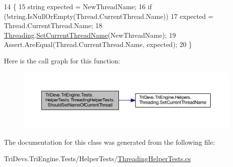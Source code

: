 \begin{DoxyCode}
14         \{
15             \textcolor{keywordtype}{string} expected = NewThreadName;
16             \textcolor{keywordflow}{if} (!\textcolor{keywordtype}{string}.IsNullOrEmpty(Thread.CurrentThread.Name))
17                 expected = Thread.CurrentThread.Name;
18             \hyperlink{class_tri_devs_1_1_tri_engine_1_1_helpers_1_1_threading}{Threading}.\hyperlink{class_tri_devs_1_1_tri_engine_1_1_helpers_1_1_threading_a8e1f96975f0e6472d032d2c6ae2ba7d9}{SetCurrentThreadName}(NewThreadName);
19             Assert.AreEqual(Thread.CurrentThread.Name, expected);
20         \}
\end{DoxyCode}


Here is the call graph for this function\-:
\nopagebreak
\begin{figure}[H]
\begin{center}
\leavevmode
\includegraphics[width=350pt]{class_tri_devs_1_1_tri_engine_1_1_tests_1_1_helper_tests_1_1_threading_helper_tests_a4bd93736e369a70e51b8399651f6f996_cgraph}
\end{center}
\end{figure}




The documentation for this class was generated from the following file\-:\begin{DoxyCompactItemize}
\item 
Tri\-Devs.\-Tri\-Engine.\-Tests/\-Helper\-Tests/\hyperlink{_threading_helper_tests_8cs}{Threading\-Helper\-Tests.\-cs}\end{DoxyCompactItemize}
